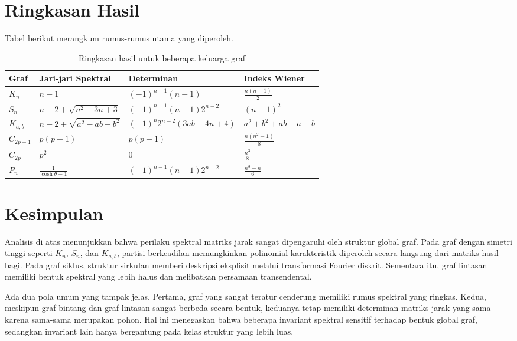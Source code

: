 \documentclass[12pt,a4paper]{article}
\begin{document}
\section{Ringkasan Hasil}

Tabel berikut merangkum rumus-rumus utama yang diperoleh.

\begin{table}[h!]
  \centering
  \small
  \caption{Ringkasan hasil untuk beberapa keluarga graf}
  \label{tab:perbandingan}
  \begin{tabular}{|l|l|l|l|}
    \hline
    \textbf{Graf} & \textbf{Jari-jari Spektral} & \textbf{Determinan}        & \textbf{Indeks Wiener} \\ \hline
    $K_n$         & $n-1$                       & $(-1)^{n-1}(n-1)$          & $\frac{n(n-1)}{2}$     \\ \hline
    $S_n$         & $n-2+\sqrt{n^2-3n+3}$       & $(-1)^{n-1}(n-1)2^{n-2}$   & $(n-1)^2$              \\ \hline
    $K_{a,b}$     & $n-2+\sqrt{a^2-ab+b^2}$     & $(-1)^n 2^{n-2}(3ab-4n+4)$ & $a^2+b^2+ab-a-b$       \\ \hline
    $C_{2p+1}$    & $p(p+1)$                    & $p(p+1)$                   & $\frac{n(n^2-1)}{8}$   \\ \hline
    $C_{2p}$      & $p^2$                       & $0$                        & $\frac{n^3}{8}$        \\ \hline
    $P_n$         & $\frac{1}{\cosh\theta-1}$   & $(-1)^{n-1}(n-1)2^{n-2}$   & $\frac{n^3-n}{6}$      \\ \hline
  \end{tabular}
\end{table}

\section{Kesimpulan}

Analisis di atas menunjukkan bahwa perilaku spektral matriks jarak sangat dipengaruhi oleh struktur global graf. Pada graf dengan simetri tinggi seperti $K_n$, $S_n$, dan $K_{a,b}$, partisi berkeadilan memungkinkan polinomial karakteristik diperoleh secara langsung dari matriks hasil bagi. Pada graf siklus, struktur sirkulan memberi deskripsi eksplisit melalui transformasi Fourier diskrit. Sementara itu, graf lintasan memiliki bentuk spektral yang lebih halus dan melibatkan persamaan transendental.

Ada dua pola umum yang tampak jelas. Pertama, graf yang sangat teratur cenderung memiliki rumus spektral yang ringkas. Kedua, meskipun graf bintang dan graf lintasan sangat berbeda secara bentuk, keduanya tetap memiliki determinan matriks jarak yang sama karena sama-sama merupakan pohon. Hal ini menegaskan bahwa beberapa invariant spektral sensitif terhadap bentuk global graf, sedangkan invariant lain hanya bergantung pada kelas struktur yang lebih luas.
\end{document}
